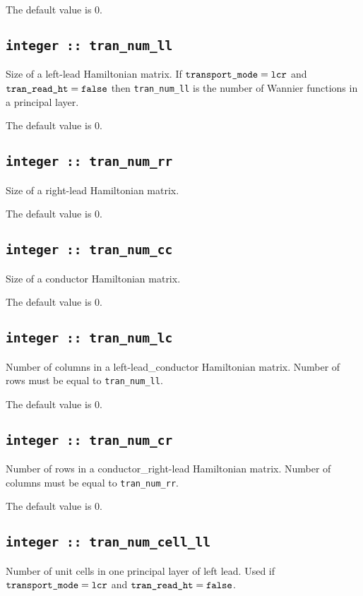The default value is 0.

\subsection[tran\_num\_ll]{\tt integer :: tran\_num\_ll}
Size of a left-lead Hamiltonian matrix. 
If $\verb#transport_mode# = \verb#lcr#$ and 
$\verb#tran_read_ht# = \verb#false#$ then 
\verb#tran_num_ll# is the number of Wannier functions
in a principal layer.

The default value is 0.

\subsection[tran\_num\_rr]{\tt integer :: tran\_num\_rr}
Size of a right-lead Hamiltonian matrix.

The default value is 0.

\subsection[tran\_num\_cc]{\tt integer :: tran\_num\_cc}
Size of a conductor Hamiltonian matrix.

The default value is 0.

\subsection[tran\_num\_lc]{\tt integer :: tran\_num\_lc}
Number of columns in a left-lead\_conductor Hamiltonian matrix.
Number of rows must be equal to \verb#tran_num_ll#.
 

The default value is 0.

\subsection[tran\_num\_cr]{\tt integer :: tran\_num\_cr}
Number of rows in a conductor\_right-lead Hamiltonian matrix.
Number of columns must be equal to \verb#tran_num_rr#.

The default value is 0.

\subsection[tran\_num\_cell\_ll]{\tt integer :: tran\_num\_cell\_ll}
Number of unit cells in one principal layer of left lead. 
Used if $\verb#transport_mode# = \verb#lcr#$ and 
$\verb#tran_read_ht# = \verb#false#$.

